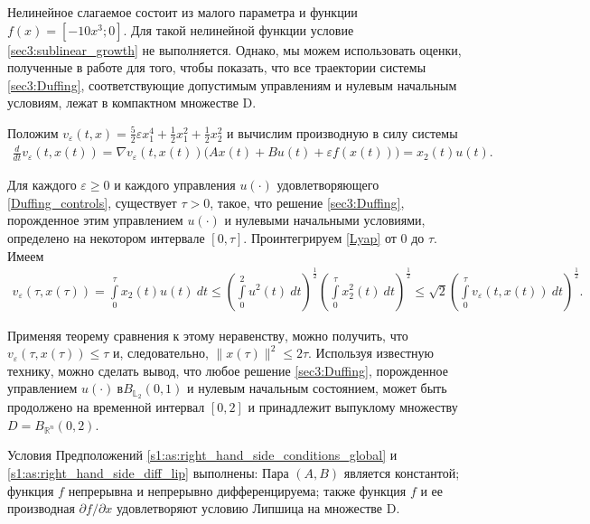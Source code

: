 \documentclass[../main.tex]{subfiles}
\begin{document}
    Нелинейное слагаемое состоит из малого параметра и функции $f(x) = [-10x^3;0]$. 
    Для такой нелинейной функции условие  \eqref{sec3:sublinear_growth} не выполняется. 
    Однако, мы можем использовать оценки, полученные в работе  \cite{Zykov2019} для того, чтобы показать, что все траектории системы \eqref{sec3:Duffing}, соответствующие допустимым управлениям и нулевым начальным условиям, лежат в компактном множестве D. 
    
    Положим $v_{\varepsilon}(t,x) = \frac{5}{2}\varepsilon x_1^4 + \frac{1}{2}x_1^2 + \frac{1}{2}x_2^2$ и вычислим производную в силу системы 
    \begin{gather}\label{Lyap}
        \frac{d}{dt} v_{\varepsilon}(t,x(t)) = \nabla v_{\varepsilon}(t,x(t)) \big(A x(t) + B u(t) + \varepsilon f(x(t))\big) = x_2(t) u(t). 
    \end{gather} 
    
    Для каждого $\varepsilon \geqslant 0$ и каждого управления $u(\cdot)$ удовлетворяющего \eqref{Duffing_controls}, существует $\tau>0$, такое, что решение \eqref{sec3:Duffing}, порожденное этим управлением $u(\cdot)$ и нулевыми начальными условиями, определено на некотором интервале $[0, \tau]$. 
    Проинтегрируем \eqref{Lyap} от $0$ до $\tau$. 
    Имеем 
    \begin{gather*}
        v_{\varepsilon}(\tau,x(\tau)) =
        \int\limits_0^{\tau} x_2(t) u(t) \ dt 
        \leqslant 
        \left(\int\limits_0^2 u^2(t) \ dt \right)^{\frac{1}{2}} \left(\int\limits_0^{\tau} x_2^2(t) \ dt \right)^{\frac{1}{2}} \leqslant \sqrt{2} \left(\int\limits_0^{\tau} v_{\varepsilon}(t,x(t)) \ dt \right)^{\frac{1}{2}}.
    \end{gather*}
    
    Применяя теорему сравнения к этому неравенству, можно получить, что $v_{\varepsilon}(\tau,x(\tau)) \leqslant \tau$ и, следовательно, $\|x(\tau)\|^2 \leqslant 2 \tau$. 
    Используя известную технику, можно сделать вывод, что любое решение \eqref{sec3:Duffing}, порожденное управлением $u(\cdot)\ в B_{\mathbb{L}_2}(0,1)$ и нулевым начальным состоянием, может быть продолжено на временной интервал $[0,2]$ и принадлежит выпуклому множеству $D = B_{\mathbb{R}^n}(0,2)$.
    
    Условия Предположений \ref{s1:as:right_hand_side_conditions_global} и \ref{s1:as:right_hand_side_diff_lip} выполнены: Пара $(A,B)$ является константой; функция $f$ непрерывна и непрерывно дифференцируема; также функция $f$ и ее производная $\partial f/\partial x$ удовлетворяют условию Липшица на множестве D.
    
\end{document}
